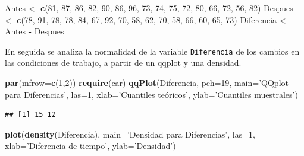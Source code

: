 \documentclass[10pt,]{krantz}
\makeatletter
\newenvironment{Shaded}{\begin{snugshade}}{\end{snugshade}}
\newcommand{\KeywordTok}[1]{\textcolor[rgb]{0.13,0.29,0.53}{\textbf{#1}}}
\newcommand{\DataTypeTok}[1]{\textcolor[rgb]{0.13,0.29,0.53}{#1}}
\newcommand{\DecValTok}[1]{\textcolor[rgb]{0.00,0.00,0.81}{#1}}
\newcommand{\StringTok}[1]{\textcolor[rgb]{0.31,0.60,0.02}{#1}}
\newcommand{\OperatorTok}[1]{\textcolor[rgb]{0.81,0.36,0.00}{\textbf{#1}}}
\newcommand{\NormalTok}[1]{#1}
\newenvironment{kframe}{%
\medskip{}
\setlength{\fboxsep}{.8em}
 \def\at@end@of@kframe{}%
 \ifinner\ifhmode%
  \def\at@end@of@kframe{\end{minipage}}%
  \begin{minipage}{\columnwidth}%
 \fi\fi%
 \def\FrameCommand##1{\hskip\@totalleftmargin \hskip-\fboxsep
 \colorbox{shadecolor}{##1}\hskip-\fboxsep
     \hskip-\linewidth \hskip-\@totalleftmargin \hskip\columnwidth}%
 \MakeFramed {\advance\hsize-\width
   \@totalleftmargin\z@ \linewidth\hsize
   \@setminipage}}%
 {\par\unskip\endMakeFramed%
 \at@end@of@kframe}
\renewenvironment{Shaded}{\begin{kframe}}{\end{kframe}}
\makeatother
\begin{document}
\begin{Shaded}
\begin{Highlighting}[]
\NormalTok{Antes   <-}\StringTok{ }\KeywordTok{c}\NormalTok{(}\DecValTok{81}\NormalTok{, }\DecValTok{87}\NormalTok{, }\DecValTok{86}\NormalTok{, }\DecValTok{82}\NormalTok{, }\DecValTok{90}\NormalTok{, }\DecValTok{86}\NormalTok{, }\DecValTok{96}\NormalTok{, }\DecValTok{73}\NormalTok{,}
             \DecValTok{74}\NormalTok{, }\DecValTok{75}\NormalTok{, }\DecValTok{72}\NormalTok{, }\DecValTok{80}\NormalTok{, }\DecValTok{66}\NormalTok{, }\DecValTok{72}\NormalTok{, }\DecValTok{56}\NormalTok{, }\DecValTok{82}\NormalTok{)}
\NormalTok{Despues <-}\StringTok{ }\KeywordTok{c}\NormalTok{(}\DecValTok{78}\NormalTok{, }\DecValTok{91}\NormalTok{, }\DecValTok{78}\NormalTok{, }\DecValTok{78}\NormalTok{, }\DecValTok{84}\NormalTok{, }\DecValTok{67}\NormalTok{, }\DecValTok{92}\NormalTok{, }\DecValTok{70}\NormalTok{,}
             \DecValTok{58}\NormalTok{, }\DecValTok{62}\NormalTok{, }\DecValTok{70}\NormalTok{, }\DecValTok{58}\NormalTok{, }\DecValTok{66}\NormalTok{, }\DecValTok{60}\NormalTok{, }\DecValTok{65}\NormalTok{, }\DecValTok{73}\NormalTok{)}
\NormalTok{Diferencia <-}\StringTok{ }\NormalTok{Antes }\OperatorTok{-}\StringTok{ }\NormalTok{Despues}
\end{Highlighting}
\end{Shaded}

En seguida se analiza la normalidad de la variable \texttt{Diferencia}
de los cambios en las condiciones de trabajo, a partir de un qqplot y
una densidad.

\begin{Shaded}
\begin{Highlighting}[]
\KeywordTok{par}\NormalTok{(}\DataTypeTok{mfrow=}\KeywordTok{c}\NormalTok{(}\DecValTok{1}\NormalTok{,}\DecValTok{2}\NormalTok{))}
\KeywordTok{require}\NormalTok{(car)}
\KeywordTok{qqPlot}\NormalTok{(Diferencia, }\DataTypeTok{pch=}\DecValTok{19}\NormalTok{, }\DataTypeTok{main=}\StringTok{'QQplot para Diferencias'}\NormalTok{, }\DataTypeTok{las=}\DecValTok{1}\NormalTok{, }
       \DataTypeTok{xlab=}\StringTok{'Cuantiles teóricos', ylab='}\NormalTok{Cuantiles muestrales}\StringTok{')}
\end{Highlighting}
\end{Shaded}

\begin{verbatim}
## [1] 15 12
\end{verbatim}

\begin{Shaded}
\begin{Highlighting}[]
\KeywordTok{plot}\NormalTok{(}\KeywordTok{density}\NormalTok{(Diferencia), }\DataTypeTok{main=}\StringTok{'Densidad para Diferencias'}\NormalTok{, }\DataTypeTok{las=}\DecValTok{1}\NormalTok{,}
     \DataTypeTok{xlab=}\StringTok{'Diferencia de tiempo'}\NormalTok{, }\DataTypeTok{ylab=}\StringTok{'Densidad'}\NormalTok{)}
\end{Highlighting}
\end{Shaded}
\end{document}
